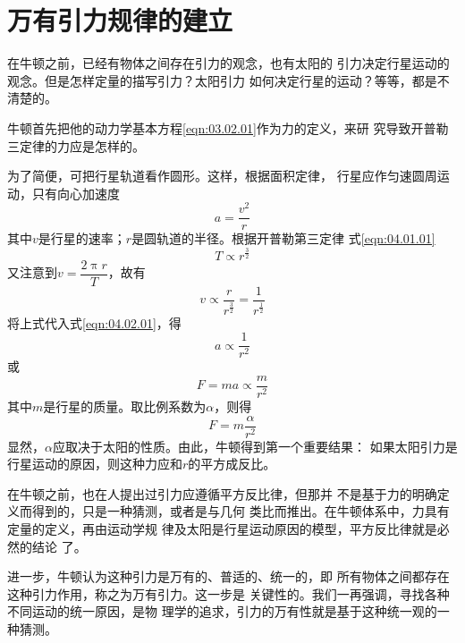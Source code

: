 \section{万有引力规律的建立}\label{sec:04.02}

在牛顿之前，已经有物体之间存在引力的观念，也有太阳的
引力决定行星运动的观念。但是怎样定量的描写引力？太阳引力
如何决定行星的运动？等等，都是不清楚的。

牛顿首先把他的动力学基本方程\eqref{eqn:03.02.01}作为力的定义，来研
究导致开普勒三定律的力应是怎样的。

为了简便，可把行星轨道看作圆形。这样，根据面积定律，
行星应作匀速圆周运动，只有向心加速度
\begin{equation}\label{eqn:04.02.01}
  a = \frac { v ^ { 2 } } { r }
\end{equation}
其中$ v $是行星的速率；$ r $是圆轨道的半径。根据开普勒第三定律
\lhbrak 式\eqref{eqn:04.01.01}\rhbrak
\begin{equation*}
  T \propto r ^ { \frac { 3 } { 2 } }
\end{equation*}
又注意到$ v = \dfrac { 2 \uppi r } { T } $，故有
\begin{equation}\label{eqn:04.02.02}
  v \propto \frac { r } { r ^ \frac { 3 } {2}} = \frac { 1 } { r ^ { \frac { 1 } { 2 } } }
\end{equation}
将上式代入式\eqref{eqn:04.02.01}，得
\begin{equation}\label{eqn:04.02.03}
  a \propto \frac { 1 } { r ^ { 2 } }
\end{equation}
或
\begin{equation*}
  F = m a \propto \frac { m } { r ^ { 2 } }
\end{equation*}
其中$ m $是行星的质量。取比例系数为$ \alpha $，则得
\begin{equation}\label{eqn:04.02.04}
  F = m \frac { \alpha } { r ^ { 2 } }
\end{equation}
显然，$ \alpha $应取决于太阳的性质。由此，牛顿得到第一个重要结果：
如果太阳引力是行星运动的原因，则这种力应和$ r $的平方成反比。

在牛顿之前，也在人提出过引力应遵循平方反比律，但那并
不是基于力的明确定义而得到的，只是一种猜测，或者是与几何
类比而推出。在牛顿体系中，力具有定量的定义，再由运动学规
律及太阳是行星运动原因的模型，平方反比律就是必然的结论
了。

进一步，牛顿认为这种引力是万有的、普适的、统一的，即
所有物体之间都存在这种引力作用，称之为万有引力。这一步是
关键性的。我们一再强调，寻找各种不同运动的统一原因，是物
理学的追求，引力的万有性就是基于这种统一观的一种猜测。


